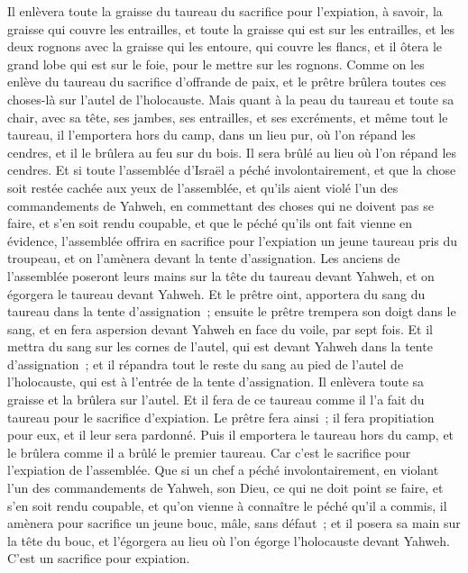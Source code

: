 \begin{multicols}{2}
Il enlèvera toute la graisse du taureau du sacrifice pour l'expiation, à savoir, la graisse qui couvre les entrailles, et toute la graisse qui est sur les entrailles,
et les deux rognons avec la graisse qui les entoure, qui couvre les flancs, et il ôtera le grand lobe qui est sur le foie, pour le mettre sur les rognons.
Comme on les enlève du taureau du sacrifice d'offrande de paix, et le prêtre brûlera toutes ces choses-là sur l'autel de l'holocauste.
Mais quant à la peau du taureau et toute sa chair, avec sa tête, ses jambes, ses entrailles, et ses excréments,
et même tout le taureau, il l'emportera hors du camp, dans un lieu pur, où l'on répand les cendres, et il le brûlera au feu sur du bois. Il sera brûlé au lieu où l'on répand les cendres.
Et si toute l'assemblée d'Israël a péché involontairement, et que la chose soit restée cachée aux yeux de l'assemblée, et qu'ils aient violé l'un des commandements de Yahweh, en commettant des choses qui ne doivent pas se faire, et s'en soit rendu coupable,
et que le péché qu'ils ont fait vienne en évidence, l'assemblée offrira en sacrifice pour l'expiation un jeune taureau pris du troupeau, et on l'amènera devant la tente d'assignation.
Les anciens de l'assemblée poseront leurs mains sur la tête du taureau devant Yahweh, et on égorgera le taureau devant Yahweh.
Et le prêtre oint, apportera du sang du taureau dans la tente d'assignation~;
ensuite le prêtre trempera son doigt dans le sang, et en fera aspersion devant Yahweh en face du voile, par sept fois.
Et il mettra du sang sur les cornes de l'autel, qui est devant Yahweh dans la tente d'assignation~; et il répandra tout le reste du sang au pied de l'autel de l'holocauste, qui est à l'entrée de la tente d'assignation.
Il enlèvera toute sa graisse et la brûlera sur l'autel.
Et il fera de ce taureau comme il l'a fait du taureau pour le sacrifice d'expiation. Le prêtre fera ainsi~; il fera propitiation pour eux, et il leur sera pardonné.
Puis il emportera le taureau hors du camp, et le brûlera comme il a brûlé le premier taureau. Car c'est le sacrifice pour l'expiation de l'assemblée.
Que si un chef a péché involontairement, en violant l'un des commandements de Yahweh, son Dieu, ce qui ne doit point se faire, et s'en soit rendu coupable,
et qu'on vienne à connaître le péché qu'il a commis, il amènera pour sacrifice un jeune bouc, mâle, sans défaut~;
et il posera sa main sur la tête du bouc, et l'égorgera au lieu où l'on égorge l'holocauste devant Yahweh. C'est un sacrifice pour expiation.

\end{multicols}
